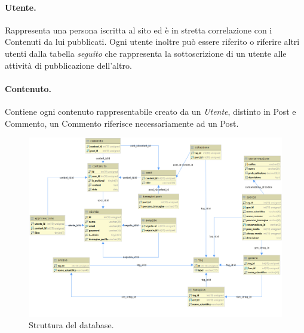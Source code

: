\documentclass[12pt, a4paper]{article}
\begin{document}
    \paragraph{Utente.} Rappresenta una persona iscritta al sito ed è in stretta correlazione con i Contenuti da lui pubblicati.
                        Ogni utente inoltre può essere riferito o riferire altri utenti dalla tabella \emph{seguito}
                        che rappresenta la sottoscrizione di un utente alle attività di pubblicazione dell'altro.
    \paragraph{Contenuto.} Contiene ogni contenuto rappresentabile creato da un \emph{Utente}, distinto in
                            Post e Commento, un Commento riferisce necessariamente ad un Post.
    \begin{figure}[htbp]
        \caption{Struttura del database.}
        \label{fig:database}
        \hspace*{-2cm}
        \includegraphics[scale= 0.5]{webBirdDB@localhost.png}
    \end{figure}
\end{document}
